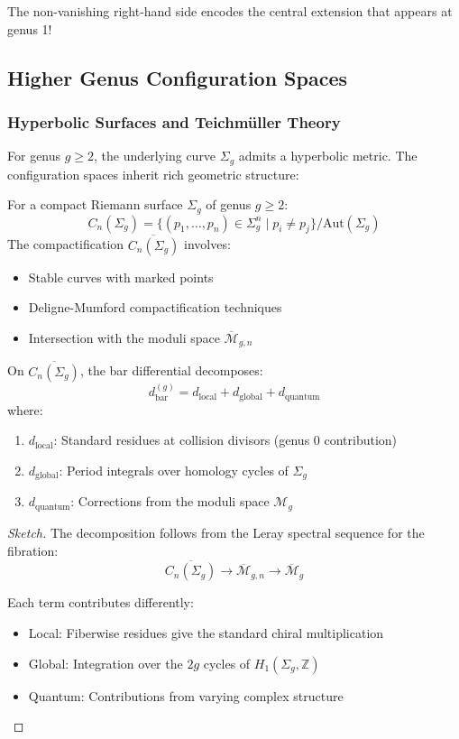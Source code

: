 The non-vanishing right-hand side encodes the central extension that appears at genus 1!

\subsection{Higher Genus Configuration Spaces}

\subsubsection{Hyperbolic Surfaces and Teichmüller Theory}

For genus $g \geq 2$, the underlying curve $\Sigma_g$ admits a hyperbolic metric. The configuration spaces inherit rich geometric structure:

\begin{definition}
For a compact Riemann surface $\Sigma_g$ of genus $g \geq 2$:
\[
C_n(\Sigma_g) = \{(p_1, \ldots, p_n) \in \Sigma_g^n \mid p_i \neq p_j\}/\text{Aut}(\Sigma_g)
\]
The compactification $\overline{C_n(\Sigma_g)}$ involves:
\begin{itemize}
\item Stable curves with marked points
\item Deligne-Mumford compactification techniques
\item Intersection with the moduli space $\overline{\mathcal{M}}_{g,n}$
\end{itemize}
\end{definition}

\begin{theorem}
On $\overline{C_n(\Sigma_g)}$, the bar differential decomposes:
\[
d_{\text{bar}}^{(g)} = d_{\text{local}} + d_{\text{global}} + d_{\text{quantum}}
\]
where:
\begin{enumerate}
\item $d_{\text{local}}$: Standard residues at collision divisors (genus 0 contribution)
\item $d_{\text{global}}$: Period integrals over homology cycles of $\Sigma_g$
\item $d_{\text{quantum}}$: Corrections from the moduli space $\mathcal{M}_g$
\end{enumerate}
\end{theorem}

\begin{proof}[Sketch]
The decomposition follows from the Leray spectral sequence for the fibration:
\[
\overline{C_n(\Sigma_g)} \to \overline{\mathcal{M}}_{g,n} \to \overline{\mathcal{M}}_g
\]

Each term contributes differently:
\begin{itemize}
\item Local: Fiberwise residues give the standard chiral multiplication
\item Global: Integration over the $2g$ cycles of $H_1(\Sigma_g, \mathbb{Z})$
\item Quantum: Contributions from varying complex structure
\end{itemize}
\end{proof}

